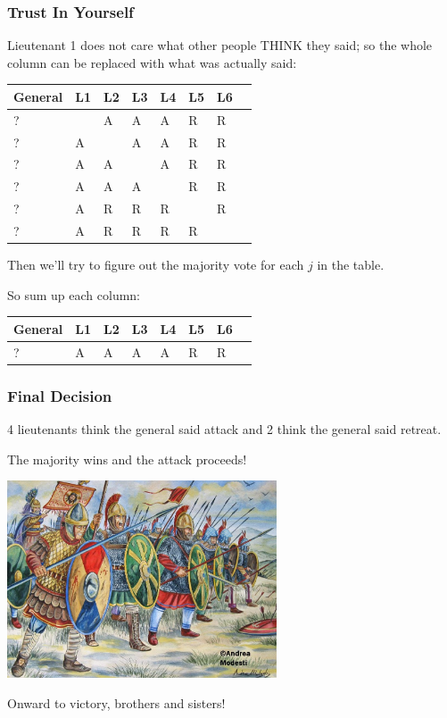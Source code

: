 \begin{frame}
\frametitle{Trust In Yourself}

Lieutenant 1 does not care what other people THINK they said; so the whole column can be replaced with what was actually said:

\begin{center}
\begin{tabular}{|l|l|l|l|l|l|l|l|}
\hline
General & L1 & L2 & L3 & L4 & L5 & L6 \\	
\hline
? & ~ & A & A & A & R & R \\ \hline
? & A & ~ & A & A & R & R \\ \hline
? & A & A & ~ & A & R & R \\ \hline
? & A & A & A & ~ & R & R \\ \hline
? & A & R & R & R & ~ & R \\ \hline
? & A & R & R & R & R & ~ \\ \hline
\end{tabular}
\end{center}

Then we'll try to figure out the majority vote for each $j$ in the table. 

So sum up each column:

\begin{center}
\begin{tabular}{|l|l|l|l|l|l|l|l|}
\hline
General & L1 & L2 & L3 & L4 & L5 & L6 \\	
\hline
? & A & A & A & A & R & R \\
\hline
\end{tabular}
\end{center}

\end{frame}


\begin{frame}
\frametitle{Final Decision}
4 lieutenants think the general said attack and 2 think the general said retreat. 

The majority wins and the attack proceeds!

\begin{center}
	\includegraphics[width=0.6\textwidth]{images/byzantine-army.jpg}
\end{center}

Onward to victory, brothers and sisters!

\end{frame}


